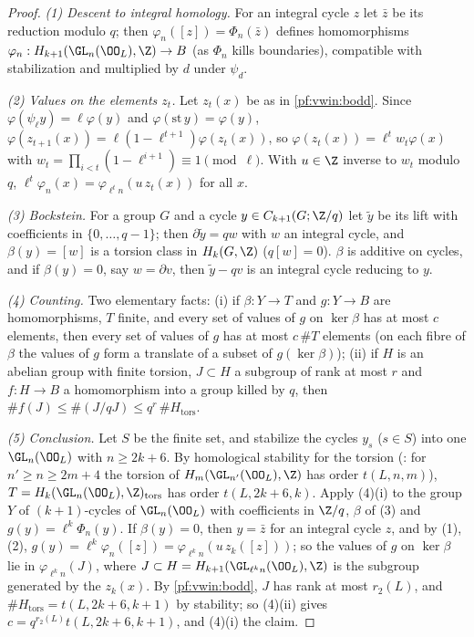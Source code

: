 \begin{proof}
\emph{(1) Descent to integral homology.} For an integral cycle $z$ let $\bar z$ be its reduction modulo $q$; then
$\varphi_n([z])=\Phi_n(\bar z)$ defines homomorphisms $\varphi_n:H_{k+1}(\GL_n(\OO_L),\Z)\to B$ (as $\Phi_n$ kills boundaries), compatible
with stabilization and multiplied by $d$ under $\psi_d$.

\emph{(2) Values on the elements $z_t$.} Let $z_t(x)$ be as in \cref{pf:vwin:bodd}. Since $\varphi(\psi_\ell y)=\ell\varphi(y)$ and
$\varphi(\mathrm{st}\,y)=\varphi(y)$, $\varphi(z_{t+1}(x))=\ell(1-\ell^{t+1})\varphi(z_t(x))$, so $\varphi(z_t(x))=\ell^tw_t\varphi(x)$ with
$w_t=\prod_{i<t}(1-\ell^{i+1})\equiv1\pmod\ell$. With $u\in\Z$ inverse to $w_t$ modulo $q$, $\ell^t\varphi_n(x)=\varphi_{\ell^tn}(u\,z_t(x))$
for all $x$.

\emph{(3) Bockstein.} For a group $G$ and a cycle $y\in C_{k+1}(G;\Z/q)$ let $\tilde y$ be its lift with coefficients in
$\{0,\dots,q-1\}$; then $\partial\tilde y=qw$ with $w$ an integral cycle, and $\beta(y)=[w]$ is a torsion class in $H_k(G,\Z)$ ($q[w]=0$).
$\beta$ is additive on cycles, and if $\beta(y)=0$, say $w=\partial v$, then $\tilde y-qv$ is an integral cycle reducing to $y$.

\emph{(4) Counting.} Two elementary facts: (i) if $\beta:Y\to T$ and $g:Y\to B$ are homomorphisms, $T$ finite, and every set of values
of $g$ on $\ker\beta$ has at most $c$ elements, then every set of values of $g$ has at most $c\,\#T$ elements (on each fibre of $\beta$
the values of $g$ form a translate of a subset of $g(\ker\beta)$); (ii) if $H$ is an abelian group with finite torsion, $J\subset H$ a
subgroup of rank at most $r$ and $f:H\to B$ a homomorphism into a group killed by $q$, then $\#f(J)\le\#(J/qJ)\le q^r\,\#H_{\mathrm{tors}}$.

\emph{(5) Conclusion.} Let $S$ be the finite set, and stabilize the cycles $y_s$ ($s\in S$) into one $\GL_n(\OO_L)$ with $n\ge2k+6$. By
homological stability for the torsion (: for $n'\ge n\ge2m+4$ the torsion of
$H_m(\GL_{n'}(\OO_L),\Z)$ has order $t(L,n,m)$), $T=H_k(\GL_n(\OO_L),\Z)_{\mathrm{tors}}$ has order $t(L,2k+6,k)$. Apply (4)(i) to the
group $Y$ of $(k+1)$-cycles of $\GL_n(\OO_L)$ with coefficients in $\Z/q$, $\beta$ of (3) and $g(y)=\ell^k\Phi_n(y)$. If $\beta(y)=0$,
then $y=\bar z$ for an integral cycle $z$, and by (1), (2), $g(y)=\ell^k\varphi_n([z])=\varphi_{\ell^kn}(u\,z_k([z]))$; so the values of $g$ on
$\ker\beta$ lie in $\varphi_{\ell^kn}(J)$, where $J\subset H=H_{k+1}(\GL_{\ell^kn}(\OO_L),\Z)$ is the subgroup generated by the $z_k(x)$.
By \cref{pf:vwin:bodd}, $J$ has rank at most $r_2(L)$, and $\#H_{\mathrm{tors}}=t(L,2k+6,k+1)$ by stability; so (4)(ii) gives
$c=q^{r_2(L)}t(L,2k+6,k+1)$, and (4)(i) the claim.
\end{proof}

